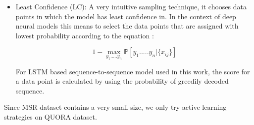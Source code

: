 \begin{itemize}
\item Least Confidence (LC): A very intuitive sampling technique, it chooses data points in which the model has least confidence in. In the context of deep neural models this means to select the data points that are assigned with lowest probability according to the equation \cite{shen}:

\begin{equation}
1 - \max_{y_{1}.....y_{n}}  \mathbb{P}  \left[ {y_{1}.....y_{n}}  | \{ x_{ij} \}  \right]   
\end{equation}

For LSTM based sequence-to-sequence model used in this work, the score for a data point is calculated by using the probability of greedily decoded sequence.

\end{itemize}

Since MSR dataset contains a very small size, we only try active learning strategies on QUORA dataset.


